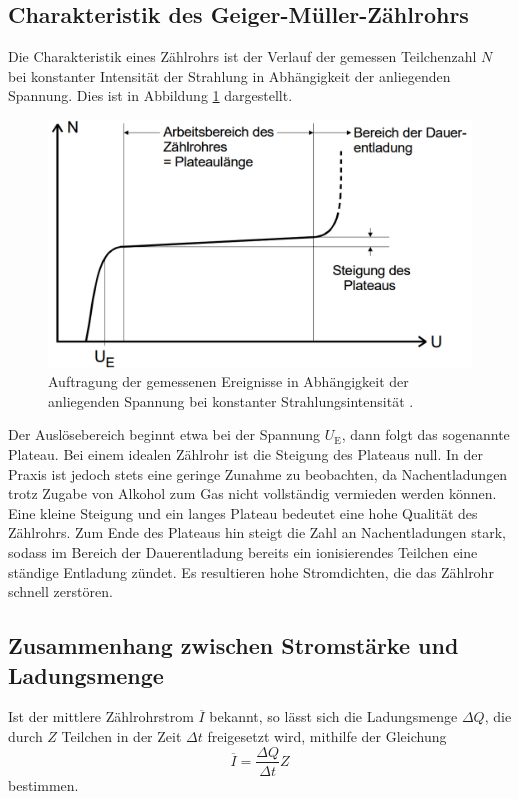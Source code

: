 \subsection{Charakteristik des Geiger-Müller-Zählrohrs}
\label{subsec:theorie3}

Die Charakteristik eines Zählrohrs ist der Verlauf der gemessen Teilchenzahl $N$ bei konstanter Intensität
der Strahlung in Abhängigkeit der anliegenden Spannung. Dies ist in Abbildung \ref{fig:charakteristik}
dargestellt.

\begin{figure}
  \centering
  \includegraphics[width=\textwidth]{data/charakteristik.png}
  \caption{Auftragung der gemessenen Ereignisse in Abhängigkeit der anliegenden Spannung bei konstanter Strahlungsintensität \cite{Versuchsanleitung}.}
  \label{fig:charakteristik}
\end{figure}

Der Auslösebereich beginnt etwa bei der Spannung $U_\text{E}$, dann folgt das sogenannte
Plateau. Bei einem idealen Zählrohr ist die Steigung des Plateaus null. In der Praxis
ist jedoch stets eine geringe Zunahme zu beobachten, da Nachentladungen trotz Zugabe
von Alkohol zum Gas nicht vollständig vermieden werden können. Eine kleine Steigung und ein
langes Plateau bedeutet eine hohe Qualität des Zählrohrs. Zum Ende des Plateaus hin
steigt die Zahl an Nachentladungen stark, sodass im Bereich der Dauerentladung bereits
ein ionisierendes Teilchen eine ständige Entladung zündet. Es resultieren hohe Stromdichten, die
das Zählrohr schnell zerstören.

\subsection{Zusammenhang zwischen Stromstärke und Ladungsmenge}
\label{subsec:theorie4}

Ist der mittlere Zählrohrstrom $\overline{I}$ bekannt, so lässt sich die Ladungsmenge
$\Delta Q$, die durch $Z$ Teilchen in der Zeit $\Delta t$ freigesetzt wird, mithilfe der Gleichung
\begin{equation}
  \overline{I} = \frac{\Delta Q}{\Delta t} Z
  \label{eqn:ladung}
\end{equation}
bestimmen.
